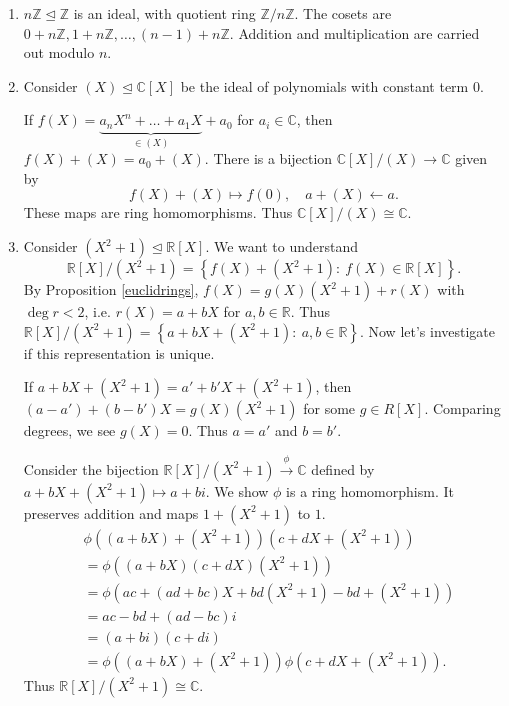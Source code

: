 \documentclass[egregdoesnotlikesansseriftitles,a4paper]{scrartcl}
\begin{document}
\begin{example}\label{polytoC}
       \begin{enumerate}
             \item $n\mathbb{Z} \unlhd \mathbb{Z}$ is an ideal, with quotient ring $\mathbb{Z}/n\mathbb{Z}$. The cosets are $0+n\mathbb{Z}, 1+n\mathbb{Z}, \ldots, (n-1)+n\mathbb{Z}$. Addition and multiplication are carried out modulo $n$.
             \item Consider $(X) \unlhd \mathbb{C}[X]$ be the ideal of polynomials with constant term 0.
             
             If $f (X)=\underbrace{a_{n}X^{n}+\ldots+ a_1 X}_{\in (X)} +a_0 $ for $a_{i}\in \mathbb{C}$, then $f (X)+(X)=a_0 +(X)$. There is a bijection $\mathbb{C}[X]/(X) \rightarrow \mathbb{C}$ given by \[
             f (X)+(X) \mapsto f (0), \quad a+(X) \leftarrow a
             .\] These maps are ring homomorphisms. Thus $\mathbb{C}[X]/(X) \cong \mathbb{C}$.
             \item Consider $(X^2+1) \unlhd \mathbb{R}[X]$. We want to understand \[
                  \mathbb{R}[X]/(X^2+1)=\left\{f (X)+(X^2+1): \ f (X)\in \mathbb{R}[X]\right\}
             .\] By Proposition \ref{euclidrings}, $f (X)=g (X)(X^2+1)+r (X)$ with $\operatorname{deg}r <2$, i.e. $r (X)=a+bX$ for $a,b \in \mathbb{R}$. Thus $\mathbb{R}[X]/(X^2+1)=\left\{a+bX+(X^2+1): \ a,b \in \mathbb{R}\right\}$. Now let's investigate if this representation is unique. 

             If $a+bX + (X^2+1)= a' +b'X +(X^2+1)$, then $(a-a')+ (b-b')X = g (X)(X^2+1)$ for some $g \in R[X]$. Comparing degrees, we see $g (X)=0$. Thus $a=a'$ and $b=b'$.
             
             Consider the bijection $\mathbb{R}[X]/(X^2+1) \overset{\phi}{\rightarrow }\mathbb{C}$ defined by $a+bX+ (X^2+1)\mapsto a+bi$. We show $\phi$ is a ring homomorphism. It preserves addition and maps $1+ (X^2+1)$ to $1$.
             \begin{align*}
                   &\phi ((a+bX)+(X^2+1))\left(c+dX+\left(X^2+1\right)\right)\\
                   &= \phi \left(\left(a+bX\right)\left(c+dX\right)\left(X^2+1\right)\right)\\
                   &= \phi \left(ac+\left(ad+bc\right)X +bd \left(X^2+1\right)-bd+\left(X^2+1\right)\right)\\
                   &=ac-bd + \left(ad-bc\right)i\\
                   &= \left(a+bi\right)\left(c+di\right)\\
                   &=\phi \left((a+bX)+(X^2+1)\right)\phi \left(c+dX+\left(X^2+1\right)\right).
             \end{align*}
             Thus $\mathbb{R}[X]/\left(X^2+1\right)\cong \mathbb{C}$.
       \end{enumerate}
\end{example}
\end{document}
